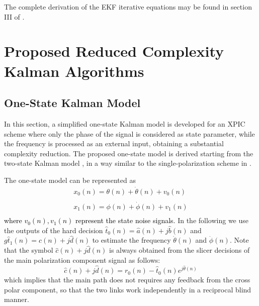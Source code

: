 The complete derivation of the EKF iterative equations may be found in section III of \cite{CommLett}.

\section{Proposed Reduced Complexity Kalman Algorithms}
\label{KalmReduced}

\subsection{One-State Kalman Model}
In this section, a simplified one-state Kalman model is developed for an XPIC scheme where only the phase of the signal is considered as state parameter, while the frequency is processed as an external input, obtaining a substantial complexity reduction. The proposed one-state model is derived starting from the two-state Kalman model \cite{CommLett}, in a way similar to the single-polarization scheme in \cite{Wei-Tsen}.

The one-state model can be represented as
\begin{equation}
\begin{array}{c}
x_0(n)=\theta(n)+\dot{\theta}(n)+v_0(n)\\
\\
x_1(n)=\phi(n)+\dot{\phi}(n)+v_1(n)\\
\end{array}
\label{eq_x1s}
\end{equation}
\textcolor{black}{where $v_0(n),v_1(n)$ represent the state noise signals.}
In the following we use the outputs of the hard decision 
$\hat{t}_0(n)=\hat{a}(n)+j\hat{b}(n)$ and $g\hat{t}_1(n)=\hat{c}(n)+j\hat{d}(n)$ 
to estimate the frequency $\dot{\theta}(n)$ and $\dot{\phi}(n)$. Note that the symbol $\hat{c}(n)+j\hat{d}(n)$ is always obtained from the slicer decisions of the main polarization component signal as follows:
\begin{equation}
\hat{c}(n)+j\hat{d}(n)=r_0(n)-\hat{t}_0(n)e^{j\hat{\theta}(n)}
\label{eq_gt12}
\end{equation}
which implies that the main path does not requires any feedback from the cross polar component, so that the two links work independently in a reciprocal blind manner.

